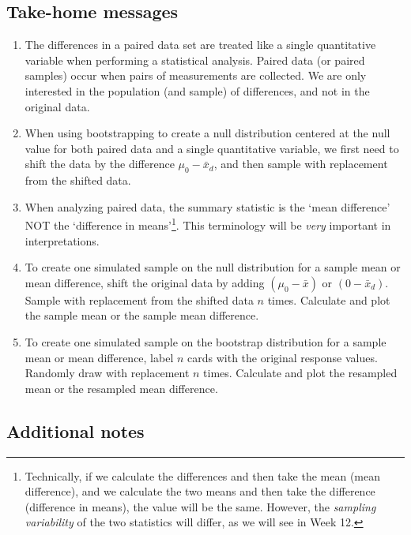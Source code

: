 \documentclass[
]{report}
\begin{document}
\vspace{.7in}

\hypertarget{take-home-messages-19}{%
\subsection{Take-home messages}\label{take-home-messages-19}}

\begin{enumerate}
\def\labelenumi{\arabic{enumi}.}
\item
  The differences in a paired data set are treated like a single quantitative variable when performing a statistical analysis. Paired data (or paired samples) occur when pairs of measurements are collected. We are only interested in the population (and sample) of differences, and not in the original data.
\item
  When using bootstrapping to create a null distribution centered at the null value for both paired data and a single quantitative variable, we first need to shift the data by the difference \(\mu_0 - \bar{x}_d\), and then sample with replacement from the shifted data.
\item
  When analyzing paired data, the summary statistic is the `mean difference' NOT the `difference in means'\footnote{Technically, if we calculate the differences and then take the mean (mean difference), and we calculate the two means and then take the difference (difference in means), the value will be the same. However, the \emph{sampling variability} of the two statistics will differ, as we will see in Week 12.}. This terminology will be \emph{very} important in interpretations.
\item
  To create one simulated sample on the null distribution for a sample mean or mean difference, shift the original data by adding \((\mu_0 - \bar{x})\) or \((0 - \bar{x}_d)\). Sample with replacement from the shifted data \(n\) times. Calculate and plot the sample mean or the sample mean difference.
\item
  To create one simulated sample on the bootstrap distribution for a sample mean or mean difference, label \(n\) cards with the original response values. Randomly draw with replacement \(n\) times. Calculate and plot the resampled mean or the resampled mean difference.
\end{enumerate}

\hypertarget{additional-notes-19}{%
\subsection{Additional notes}\label{additional-notes-19}}
\end{document}
